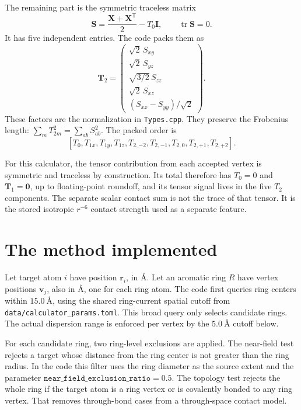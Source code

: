 \documentclass[11pt]{article}
\begin{document}
The remaining part is the symmetric traceless matrix
\begin{equation}
  \bm S = \frac{\bm X+\bm X^{\mathsf T}}{2} - T_0\bm I,
  \qquad \operatorname{tr}\bm S=0 .
  \label{eq:symmetric-traceless}
\end{equation}
It has five independent entries. The code packs them as
\begin{equation}
  \bm T_2 =
  \begin{pmatrix}
    \sqrt{2}\,S_{xy}\\
    \sqrt{2}\,S_{yz}\\
    \sqrt{3/2}\,S_{zz}\\
    \sqrt{2}\,S_{xz}\\
    (S_{xx}-S_{yy})/\sqrt{2}
  \end{pmatrix}.
  \label{eq:t2}
\end{equation}
These factors are the normalization in \texttt{Types.cpp}. They preserve the
Frobenius length: \(\sum_m T_{2m}^2=\sum_{ab}S_{ab}^2\). The packed order is
\[
  [T_0,T_{1x},T_{1y},T_{1z},
    T_{2,-2},T_{2,-1},T_{2,0},T_{2,+1},T_{2,+2}] .
\]

For this calculator, the tensor contribution from each accepted vertex is
symmetric and traceless by construction. Its total therefore has
\(T_0=0\) and \(\bm T_1=\bm0\), up to floating-point roundoff, and its tensor
signal lives in the five \(T_2\) components. The separate scalar contact sum
is not the trace of that tensor. It is the stored isotropic \(r^{-6}\) contact
strength used as a separate feature.

\section{The method implemented}

Let target atom \(i\) have position \(\bm r_i\), in \(\si{\angstrom}\). Let an
aromatic ring \(R\) have vertex positions \(\bm v_j\), also in
\(\si{\angstrom}\), one for each ring atom. The code first queries ring centers
within \(\SI{15.0}{\angstrom}\), using the shared ring-current spatial cutoff
from \texttt{data/calculator\_params.toml}. This broad query only selects
candidate rings. The actual dispersion range is enforced per vertex by the
\(\SI{5.0}{\angstrom}\) cutoff below.

For each candidate ring, two ring-level exclusions are applied. The near-field
test rejects a target whose distance from the ring center is not greater than
the ring radius. In the code this filter uses the ring diameter as the source
extent and the parameter
\(\texttt{near\_field\_exclusion\_ratio}=0.5\). The topology test rejects the
whole ring if the target atom is a ring vertex or is covalently bonded to any
ring vertex. That removes through-bond cases from a through-space contact
model.
\end{document}
